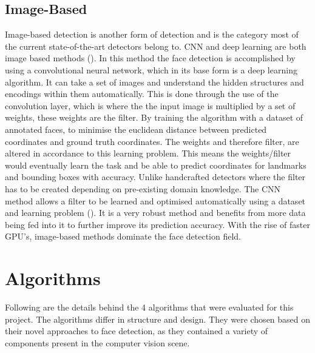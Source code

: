 \documentclass{l4proj}
\begin{document}
\subsection{Image-Based}
\label{imagebased}
Image-based detection is another form of detection and is the category most of the current state-of-the-art detectors belong to. CNN and deep learning are both image based methods (\cite{mlm}). In this method the face detection is accomplished by using a convolutional neural network, which in its base form is a deep learning algorithm. It can take a set of images and understand the hidden structures and encodings within them automatically. This is done through the use of the convolution layer, which is where the the input image is multiplied by a set of weights, these weights are the filter. By training the algorithm with a dataset of annotated faces, to minimise the euclidean distance between predicted coordinates and ground truth coordinates. The weights and therefore filter, are altered in accordance to this learning problem. This means the weights/filter would eventually learn the task and be able to predict coordinates for landmarks and bounding boxes with accuracy. Unlike handcrafted detectors where the filter has to be created depending on pre-existing domain knowledge. The CNN method allows a filter to be learned and optimised automatically using a dataset and learning problem (\cite{mlmconv}). It is a very robust method and benefits from more data being fed into it to further improve its prediction accuracy. With the rise of faster GPU's, image-based methods dominate the face detection field.

\section{Algorithms}
\label{algorithms}
Following are the details behind the 4 algorithms that were evaluated for this project. The algorithms differ in structure and design. They were chosen based on their novel approaches to face detection, as they contained a variety of components present in the computer vision scene.
\end{document}
